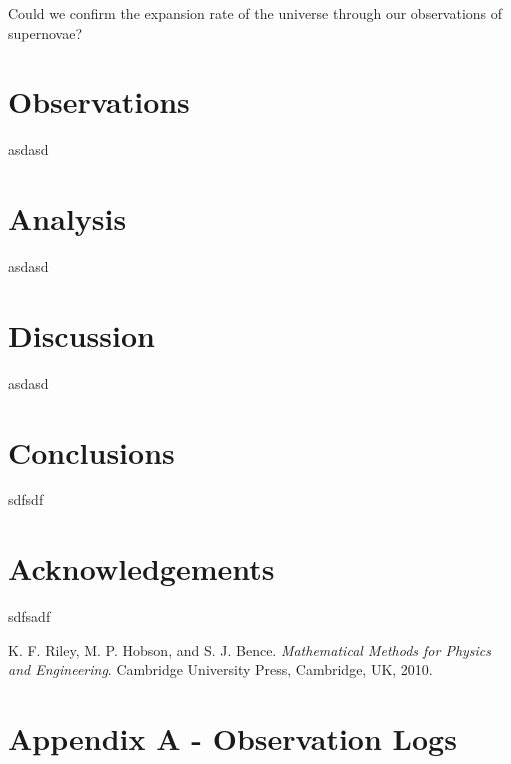 \documentclass[twocolumn]{revtex4}
\begin{document}
Could we confirm the expansion rate of the universe through our observations of supernovae? 

\vspace{-3ex}
\section{Observations} 
\vspace{-2ex}

asdasd

\vspace{-3ex}
\section{Analysis}
\vspace{-2ex}

asdasd

\vspace{-3ex}
\section{Discussion}
\vspace{-2ex}

asdasd

\vspace{-5ex}
\section{Conclusions}
\vspace{-2ex}

sdfsdf

\vspace{-5ex}
\section{Acknowledgements}
\vspace{-2ex}

sdfsadf

\begin{thebibliography}{5}
	K. F. Riley, M. P. Hobson, and S. J. Bence.
	\textit{Mathematical Methods for Physics and Engineering}.
	Cambridge University Press, Cambridge, UK, 2010.	
\end{thebibliography}
\clearpage

\vfill
\twocolumngrid
\vspace{-3ex}
\section*{Appendix A - Observation Logs}
\vspace{-2ex}



\clearpage
\end{document}
